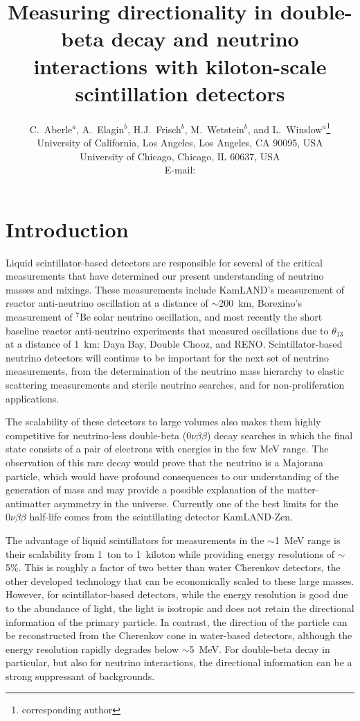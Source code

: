 \documentclass[cits]{JINST}
\title{Measuring directionality in double-beta decay and neutrino interactions with kiloton-scale scintillation detectors}
\author{C.~Aberle$^a$, A.~Elagin$^b$, H.J.~Frisch$^b$, M.~Wetstein$^b$, and L.~Winslow$^a$\setcounter{footnote}{0}\thanks{corresponding author}\\
\llap{$^a$}University of California, Los Angeles, Los Angeles, CA 90095, USA\\
\llap{$^b$}University of Chicago, Chicago, IL 60637, USA\\
  E-mail: \email{lwinslow@physics.ucla.edu}}
\begin{document}
\section{Introduction}
Liquid scintillator-based detectors are responsible for several of the
critical measurements that have determined our present understanding
of neutrino masses and mixings. These measurements include KamLAND's
measurement of reactor anti-neutrino oscillation at a distance of
$\sim$200~km\cite{kam2013}, Borexino's measurement of $^{7}$Be solar
neutrino oscillation\cite{borexino}, and most recently the short
baseline reactor anti-neutrino experiments that measured oscillations
due to $\theta_{13}$ at a distance of 1~km: Daya Bay\cite{dbtwo},
Double Chooz\cite{dctwo, dchydrogen}, and RENO\cite{reno}.
Scintillator-based neutrino detectors will continue to be important for the
next set of neutrino measurements, from the determination of the
neutrino mass hierarchy\cite{juno,reno50} to elastic scattering
measurements\cite{isodarscatt} and sterile neutrino
searches\cite{isodar,nist}, and for non-proliferation
applications\cite{nucifer, songs}.

The scalability of these detectors to large volumes also makes them
highly competitive for neutrino-less double-beta ($0\nu\beta\beta$)
decay searches in which the final state consists of a pair of
electrons with energies in the few MeV range.  The observation of this
rare decay would prove that the neutrino is a Majorana particle, which
would have profound consequences to our understanding of the generation of
mass and may provide a possible explanation of the matter-antimatter
asymmetry in the universe.  Currently one of the best limits for the
$0\nu\beta\beta$ half-life comes from the scintillating detector
KamLAND-Zen\cite{KZ0nu}.

The advantage of liquid scintillators for measurements in the
$\sim$1~MeV range is their scalability from 1~ton to 1~kiloton while
providing energy resolutions of $\sim$5\%. This is roughly a factor of
two better than water Cherenkov detectors, the other developed
technology that can be economically scaled to these large
masses. However, for scintillator-based detectors, while the energy
resolution is good due to the abundance of light, the light is
isotropic and does not retain the directional information of the
primary particle.  In contrast, the direction of the particle can be
reconstructed from the Cherenkov cone in water-based detectors,
although the energy resolution rapidly degrades below $\sim$5~MeV. For
double-beta decay in particular, but also for neutrino interactions,
the directional information can be a strong suppressant of
backgrounds.
\end{document}
